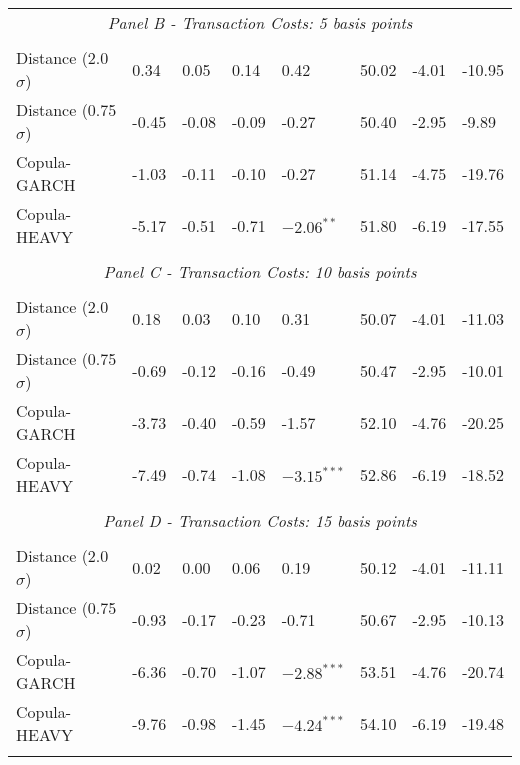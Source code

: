 \documentclass[a4paper,12pt]{report}
\begin{document}
\begin{refsection}
\begin{threeparttable}[H]
\begin{tabularx}{\textwidth}{@{\extracolsep{\fill}}llllllll@{}}
		\multicolumn{8}{c}{\textit{Panel B - Transaction Costs: 5 basis points}} \\
		&       &       &       &       &       &       &  \\
		Distance (2.0$\sigma$) & 0.34  & 0.05  & 0.14  & 0.42  & 50.02 & -4.01  & -10.95 \\
		Distance (0.75$\sigma$) & -0.45 & -0.08 & -0.09 & -0.27 & 50.40 & -2.95  & -9.89 \\
		Copula-GARCH & -1.03 & -0.11 & -0.10 & -0.27 & 51.14 & -4.75  & -19.76 \\
		Copula-HEAVY & -5.17 & -0.51 & -0.71 & $-2.06^{**}$ & 51.80 & -6.19  & -17.55 \\
		\multicolumn{1}{r}{} & \multicolumn{1}{r}{} & \multicolumn{1}{r}{} & \multicolumn{1}{r}{} & \multicolumn{1}{r}{} & \multicolumn{1}{r}{} & \multicolumn{1}{r}{} & \multicolumn{1}{r}{} \\
		\multicolumn{8}{c}{\textit{Panel C - Transaction Costs: 10 basis points}} \\
		&       &       &       &       &       &       &  \\
		Distance (2.0$\sigma$) & 0.18  & 0.03  & 0.10  & 0.31  & 50.07 & -4.01  & -11.03 \\
		Distance (0.75$\sigma$) & -0.69 & -0.12 & -0.16 & -0.49 & 50.47 & -2.95  & -10.01 \\
		Copula-GARCH & -3.73 & -0.40 & -0.59 & -1.57 & 52.10 & -4.76  & -20.25 \\
		Copula-HEAVY & -7.49 & -0.74 & -1.08 & $-3.15^{***}$ & 52.86 & -6.19  & -18.52 \\
		\multicolumn{1}{r}{} & \multicolumn{1}{r}{} & \multicolumn{1}{r}{} & \multicolumn{1}{r}{} & \multicolumn{1}{r}{} & \multicolumn{1}{r}{} & \multicolumn{1}{r}{} & \multicolumn{1}{r}{} \\
		\multicolumn{8}{c}{\textit{Panel D - Transaction Costs: 15 basis points}} \\
		&       &       &       &       &       &       &  \\
		Distance (2.0$\sigma$) & 0.02  & 0.00  & 0.06  & 0.19  & 50.12 & -4.01  & -11.11 \\
		Distance (0.75$\sigma$) & -0.93 & -0.17 & -0.23 & -0.71 & 50.67 & -2.95  & -10.13 \\
		Copula-GARCH & -6.36 & -0.70 & -1.07 & $-2.88^{***}$ & 53.51 & -4.76  & -20.74 \\
		Copula-HEAVY & -9.76 & -0.98 & -1.45 & $-4.24^{***}$ & 54.10 & -6.19  & -19.48 \\
		\multicolumn{1}{r}{} & \multicolumn{1}{r}{} & \multicolumn{1}{r}{} & \multicolumn{1}{r}{} & \multicolumn{1}{r}{} & \multicolumn{1}{r}{} & \multicolumn{1}{r}{} & \multicolumn{1}{r}{} \\

\end{tabularx}
\end{threeparttable}
\end{refsection}
\end{document}
